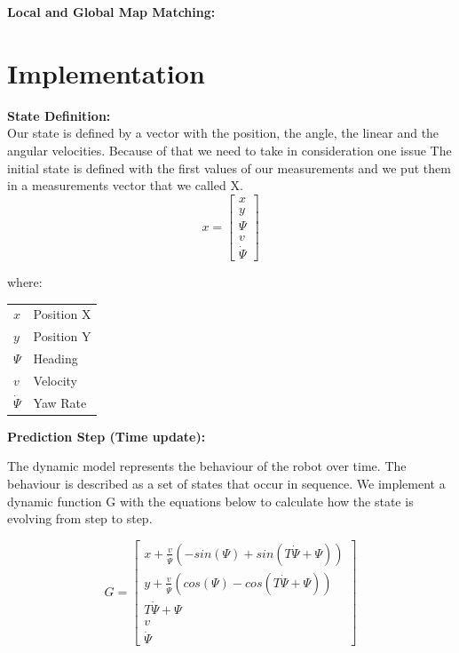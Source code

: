 \documentclass[a4paper]{IEEEtran}
\makeatletter
\newenvironment{conditions}
  {\par\vspace{\abovedisplayskip}\noindent\begin{tabular}{>{$}l<{$} @{${}={}$} l}}
  {\end{tabular}\par\vspace{\belowdisplayskip}}
\makeatother
\begin{document}
\textbf{Local and Global Map Matching:}\\




\section{Implementation}
\label{sec:implementation}

\textbf{State Definition:}\\
Our state is defined by a vector with the position, the angle, the linear and the angular velocities.
Because of that we need to take in consideration one issue 
The initial state is defined with the first values of our measurements and we put them in a measurements vector that we called X.\\

\[
x
=
\begin{bmatrix}
    x       \\
    y    \\
    \Psi      \\
    v      \\
    \dot{\Psi}       
\end{bmatrix}
\]\par
where:
\begin{conditions}
 x     &  Position X \\
 y     &  Position Y \\
 \Psi     &  Heading \\
 v     &  Velocity \\   
 \dot{\Psi} &  Yaw Rate
\end{conditions}


\textbf{Prediction Step (Time update):}

The dynamic model represents the behaviour of the robot over time. The behaviour is described as a set of states that occur in sequence. We implement a dynamic function G with the equations below to calculate how the state is evolving from step to step.

\[
G
=
\begin{bmatrix}
    x + {\frac{v}{\dot{\Psi}}}(-sin(\Psi)+sin(T\dot{\Psi} +\Psi))      \\
    y + {\frac{v}{\dot{\Psi}}}(cos(\Psi)-cos(T\dot{\Psi} +\Psi))   \\
    T\dot{\Psi} +\Psi      \\
    v      \\
    \dot{\Psi}       
\end{bmatrix}
\]
\\
\end{document}
